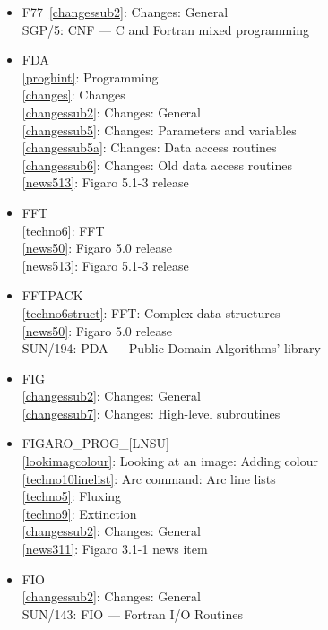 \documentclass[11pt,twoside]{article}
\newcommand{\htmlref}[2]{#1}
\newcommand{\xref}[3]{#1}
\newcommand{\idxint}[2]{\ref{#1}: \htmlref{#2}{#1}}
\newcommand{\idxint}[2]{\htmlref{#2}{#1}}
\newcommand{\latorhtm}[2]{#1}
\newcommand{\latorhtm}[2]{#2}
\begin{document}
\begin{itemize}
\item F77\
   \idxint{changessub2}{Changes: General}\\
   \xref{SGP/5: CNF \latorhtm{---}{-} C and Fortran mixed programming}{sgp5}{}
\item FDA\\
   \idxint{proghint}{Programming}\\
   \idxint{changes}{Changes}\\
   \idxint{changessub2}{Changes: General}\\
   \idxint{changessub5}{Changes: Parameters and variables}\\
   \idxint{changessub5a}{Changes: Data access routines}\\
   \idxint{changessub6}{Changes: Old data access routines}\\
   \idxint{news513}{Figaro 5.1-3 release}
\item FFT\\
   \idxint{techno6}{FFT}\\
   \idxint{news50}{Figaro 5.0 release}\\
   \idxint{news513}{Figaro 5.1-3 release}
\item FFTPACK\\
   \idxint{techno6struct}{FFT: Complex data structures}\\
   \idxint{news50}{Figaro 5.0 release}\\
   \xref{SUN/194: PDA \latorhtm{---}{-} Public Domain Algorithms' library}{sun194}{}
\item FIG\\
   \idxint{changessub2}{Changes: General}\\
   \idxint{changessub7}{Changes: High-level subroutines}
\item FIGARO\_PROG\_[LNSU]\\
   \idxint{lookimagcolour}{Looking at an image: Adding colour}\\
   \idxint{techno10linelist}{Arc command: Arc line lists}\\
   \idxint{techno5}{Fluxing}\\
   \idxint{techno9}{Extinction}\\
   \idxint{changessub2}{Changes: General}\\
   \idxint{news311}{Figaro 3.1-1 news item}
\item FIO\\
   \idxint{changessub2}{Changes: General}\\
   \xref{SUN/143: FIO \latorhtm{---}{-} Fortran I/O Routines}{sun143}{}

\end{itemize}
\end{document}
